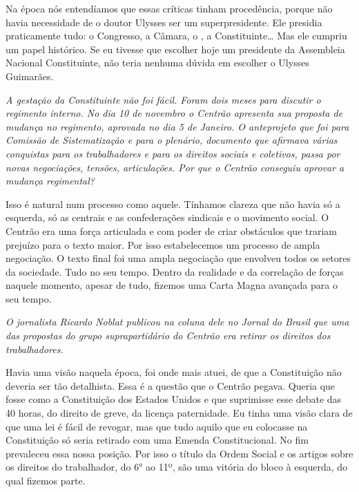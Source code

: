 Na época nós entendíamos que essas críticas tinham
procedência, porque não havia necessidade de o doutor Ulysses ser um
superpresidente. Ele presidia praticamente tudo: o Congresso, a Câmara,
o , a Constituinte\ldots{} Mas ele cumpriu um papel histórico. Se eu
tivesse que escolher hoje um presidente da Assembleia Nacional
Constituinte, não teria nenhuma dúvida em escolher o Ulysses Guimarães.

\medskip

\noindent\emph{A gestação da Constituinte não foi fácil. Foram dois meses para
discutir o regimento interno. No dia 10 de novembro o Centrão apresenta
sua proposta de mudança no regimento, aprovada no dia 5 de Janeiro. O
anteprojeto que foi para Comissão de Sistematização e para o plenário,
documento que afirmava várias conquistas para os trabalhadores e para os
direitos sociais e coletivos, passa por novas negociações, tensões,
articulações. Por que o Centrão conseguiu aprovar a mudança regimental?}

Isso é natural num processo como aquele. Tínhamos clareza
que não havia só a esquerda, só as centrais e as confederações sindicais
e o movimento social. O Centrão era uma força articulada e com poder de
criar obstáculos que trariam prejuízo para o texto maior. Por isso
estabelecemos um processo de ampla negociação. O texto final foi uma
ampla negociação que envolveu todos os setores da sociedade. Tudo no seu
tempo. Dentro da realidade e da correlação de forças naquele momento,
apesar de tudo, fizemos uma Carta Magna avançada para o seu tempo.

\medskip

\noindent\emph{O jornalista Ricardo Noblat publicou na coluna dele no \emph{Jornal do
Brasil} que uma das propostas do grupo suprapartidário do Centrão era
retirar os direitos dos trabalhadores.}

Havia uma visão naquela época, foi onde mais atuei, de
que a Constituição não deveria ser tão detalhista. Essa é a questão que
o Centrão pegava. Queria que fosse como a Constituição dos Estados
Unidos e que suprimisse esse debate das 40 horas, do direito de greve,
da licença paternidade. Eu tinha uma visão clara de que uma lei é fácil
de revogar, mas que tudo aquilo que eu colocasse na Constituição só
seria retirado com uma Emenda Constitucional. No fim prevaleceu essa
nossa posição. Por isso o título da Ordem Social e os artigos sobre os
direitos do trabalhador, do 6° ao 11º, são uma vitória do bloco à
esquerda, do qual fizemos parte.


